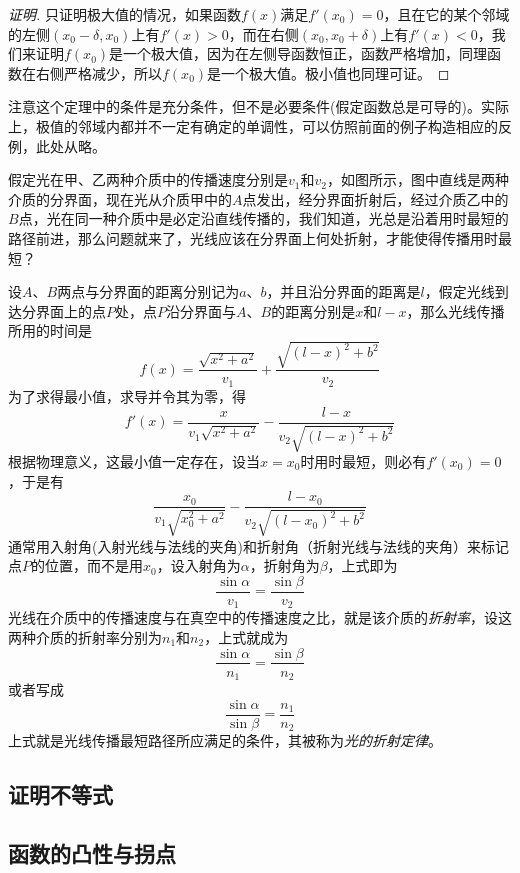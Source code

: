 \begin{proof}[证明]
 只证明极大值的情况，如果函数$f(x)$满足$f'(x_0)=0$，且在它的某个邻域的左侧$(x_0-\delta,x_0)$上有$f'(x)>0$，而在右侧$(x_0,x_0+\delta)$上有$f'(x)<0$，我们来证明$f(x_0)$是一个极大值，因为在左侧导函数恒正，函数严格增加，同理函数在右侧严格减少，所以$f(x_0)$是一个极大值。极小值也同理可证。
\end{proof}

\begin{example}
  注意这个定理中的条件是充分条件，但不是必要条件(假定函数总是可导的)。实际上，极值的邻域内都并不一定有确定的单调性，可以仿照前面的例子构造相应的反例，此处从略。
\end{example}

\begin{example}[光的折射定律]
  假定光在甲、乙两种介质中的传播速度分别是$v_1$和$v_2$，如图所示，图中直线是两种介质的分界面，现在光从介质甲中的$A$点发出，经分界面折射后，经过介质乙中的$B$点，光在同一种介质中是必定沿直线传播的，我们知道，光总是沿着用时最短的路径前进，那么问题就来了，光线应该在分界面上何处折射，才能使得传播用时最短？

  设$A$、$B$两点与分界面的距离分别记为$a$、$b$，并且沿分界面的距离是$l$，假定光线到达分界面上的点$P$处，点$P$沿分界面与$A$、$B$的距离分别是$x$和$l-x$，那么光线传播所用的时间是
  \[ f(x) = \frac{\sqrt{x^2+a^2}}{v_1}+\frac{\sqrt{(l-x)^2+b^2}}{v_2} \]
  为了求得最小值，求导并令其为零，得
  \[ f'(x) = \frac{x}{v_1\sqrt{x^2+a^2}} - \frac{l-x}{v_2 \sqrt{(l-x)^2+b^2}} \]
  根据物理意义，这最小值一定存在，设当$x=x_0$时用时最短，则必有$f'(x_0)=0$，于是有
  \[ \frac{x_0}{v_1\sqrt{x_0^2+a^2}} - \frac{l-x_0}{v_2 \sqrt{(l-x_0)^2+b^2}}\]
  通常用入射角(入射光线与法线的夹角)和折射角（折射光线与法线的夹角）来标记点$P$的位置，而不是用$x_0$，设入射角为$\alpha$，折射角为$\beta$，上式即为
  \[ \frac{\sin{\alpha}}{v_1} = \frac{\sin{\beta}}{v_2} \]
  光线在介质中的传播速度与在真空中的传播速度之比，就是该介质的\emph{折射率}，设这两种介质的折射率分别为$n_1$和$n_2$，上式就成为
  \[ \frac{\sin{\alpha}}{n_1} = \frac{\sin{\beta}}{n_2} \]
  或者写成
  \[ \frac{\sin{\alpha}}{\sin{\beta}} = \frac{n_1}{n_2} \]
  上式就是光线传播最短路径所应满足的条件，其被称为\emph{光的折射定律}。
\end{example}

\subsection{证明不等式}
\label{sec:proof-inequality-use-derivative}

\subsection{函数的凸性与拐点}
\label{sec:convert-of-function}

